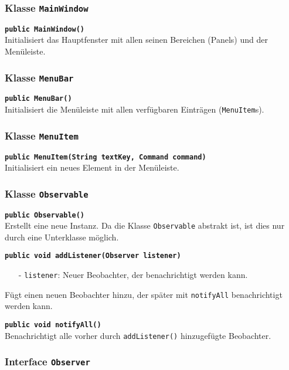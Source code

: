 \documentclass[parskip=full,11pt,twoside]{scrartcl}
\begin{document}
\subsubsection{Klasse \texttt{MainWindow}}

\textbf{\texttt{public MainWindow()}}\\
Initialisiert das Hauptfenster mit allen seinen Bereichen (Panels) und der Menüleiste.

\subsubsection{Klasse \texttt{MenuBar}}

\textbf{\texttt{public MenuBar()}}\\
Initialisiert die Menüleiste mit allen verfügbaren Einträgen (\texttt{MenuItem}s).

\subsubsection{Klasse \texttt{MenuItem}}

\textbf{\texttt{public MenuItem(String textKey, Command command)}}\\
Initialisiert ein neues Element in der Menüleiste.

\subsubsection{Klasse \texttt{Observable}}

\textbf{\texttt{public Observable()}}\\
Erstellt eine neue Instanz. Da die Klasse \texttt{Observable} abstrakt ist, ist dies nur durch eine Unterklasse möglich.

\textbf{\texttt{public void addListener(Observer listener)}}
\begin{itemize}[noitemsep]
	\item[-] \texttt{listener}: Neuer Beobachter, der benachrichtigt werden kann.
\end{itemize}
Fügt einen neuen Beobachter hinzu, der später mit \texttt{notifyAll} benachrichtigt werden kann.

\textbf{\texttt{public void notifyAll()}}\\
Benachrichtigt alle vorher durch \texttt{addListener()} hinzugefügte Beobachter.

\subsubsection{Interface \texttt{Observer}}
\end{document}
